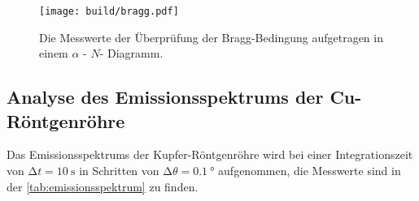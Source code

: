 \begin{figure}
  \centering
  \texttt{[image: build/bragg.pdf]}
  \caption{Die Messwerte der Überprüfung der Bragg-Bedingung aufgetragen in einem $\alpha$ - $N$- Diagramm.}
  \label{fig:bragg}
\end{figure}



\subsection{Analyse des Emissionsspektrums der Cu-Röntgenröhre}

  Das Emissionsspektrums der Kupfer-Röntgenröhre wird bei einer Integrationszeit von $\increment t = \SI{10}{\second}$ in Schritten von $\increment \theta = \SI{0.1}{\degree}$
  aufgenommen, die Messwerte sind in der \autoref{tab:emissionsspektrum} zu finden. 

